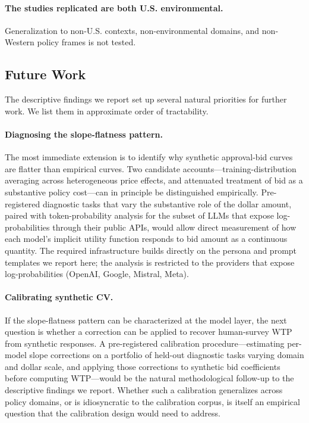 \documentclass[12pt]{article}
\begin{document}
\paragraph{The studies replicated are both U.S. environmental.}
Generalization to non-U.S. contexts, non-environmental domains, and
non-Western policy frames is not tested.

\subsection{Future Work}\label{sec:disc-future-work}

The descriptive findings we report set up several natural priorities for
further work. We list them in approximate order of tractability.

\paragraph{Diagnosing the slope-flatness pattern.} The most immediate
extension is to identify why synthetic approval-bid curves are flatter
than empirical curves. Two candidate accounts---training-distribution
averaging across heterogeneous price effects, and attenuated treatment
of bid as a substantive policy cost---can in principle be distinguished
empirically. Pre-registered diagnostic tasks that vary the substantive
role of the dollar amount, paired with token-probability analysis for
the subset of LLMs that expose log-probabilities through their public
APIs, would allow direct measurement of how each model's implicit
utility function responds to bid amount as a continuous quantity. The
required infrastructure builds directly on the persona and prompt
templates we report here; the analysis is restricted to the providers
that expose log-probabilities (OpenAI, Google, Mistral, Meta).

\paragraph{Calibrating synthetic CV.} If the slope-flatness pattern can
be characterized at the model layer, the next question is whether a
correction can be applied to recover human-survey WTP from synthetic
responses. A pre-registered calibration procedure---estimating per-model
slope corrections on a portfolio of held-out diagnostic tasks varying
domain and dollar scale, and applying those corrections to synthetic
bid coefficients before computing WTP---would be the natural
methodological follow-up to the descriptive findings we report. Whether
such a calibration generalizes across policy domains, or is idiosyncratic
to the calibration corpus, is itself an empirical question that the
calibration design would need to address.
\end{document}
